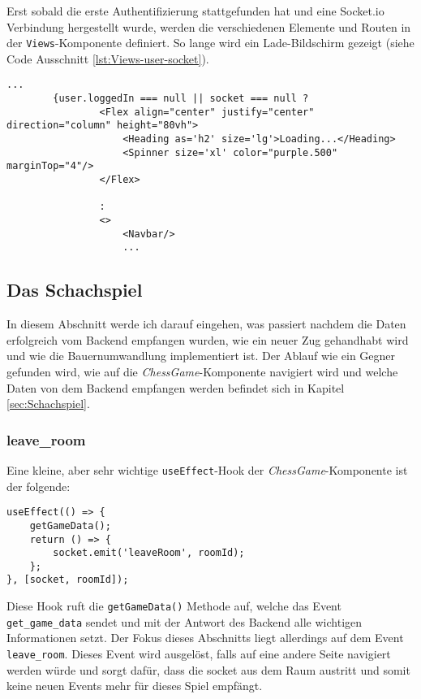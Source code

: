 Erst sobald die erste Authentifizierung stattgefunden hat und eine Socket.io Verbindung hergestellt wurde, werden die verschiedenen Elemente und Routen in der \verb|Views|-Komponente definiert. So lange wird ein Lade-Bildschirm gezeigt (siehe Code Ausschnitt \ref{lst:Views-user-socket}).

\begin{lstlisting}[style=codeStyle, caption={Ausschnitt der \textit{Views}-Komponente}, label={lst:Views-user-socket}]
		   ...
        {user.loggedIn === null || socket === null ?
                <Flex align="center" justify="center" direction="column" height="80vh">
                    <Heading as='h2' size='lg'>Loading...</Heading>
                    <Spinner size='xl' color="purple.500" marginTop="4"/>
                </Flex>

                :
                <>
                    <Navbar/>
                    ...
\end{lstlisting}

\subsection{Das Schachspiel}
In diesem Abschnitt werde ich darauf eingehen, was passiert nachdem die Daten erfolgreich vom Backend empfangen wurden, wie ein neuer Zug gehandhabt wird und wie die Bauernumwandlung implementiert ist.
Der Ablauf wie ein Gegner gefunden wird, wie auf die \textit{ChessGame}-Komponente navigiert wird und welche Daten von dem Backend empfangen werden befindet sich in Kapitel \ref{sec:Schachspiel}.

\subsubsection{leave\_room}
Eine kleine, aber sehr wichtige \verb|useEffect|-Hook der \textit{ChessGame}-Komponente ist der folgende:

\begin{lstlisting}[style=codeStyle, caption={useEffect-Hook für das holen der Daten und das verlassen des Raumes}, label={lst:Views-user-socket}]
useEffect(() => {
    getGameData();
    return () => {
        socket.emit('leaveRoom', roomId);
    };
}, [socket, roomId]);
\end{lstlisting}

Diese Hook ruft die \verb|getGameData()| Methode auf, welche das Event \verb|get_game_data| sendet und mit der Antwort des Backend alle wichtigen Informationen setzt. Der Fokus dieses Abschnitts liegt allerdings auf dem Event \verb|leave_room|. Dieses Event wird ausgelöst, falls auf eine andere Seite navigiert werden würde und sorgt dafür, dass die socket aus dem Raum austritt und somit keine neuen Events mehr für dieses Spiel empfängt.

